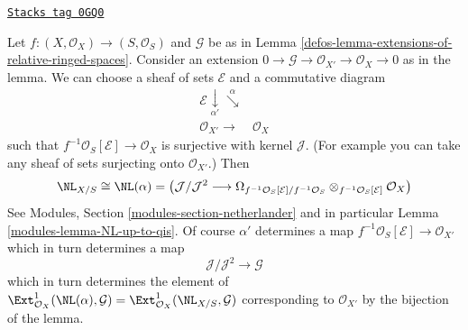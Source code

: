 \begin{remark}
\label{defos-remark-extensions-of-relative-ringed-spaces}
\href{https://stacks.math.columbia.edu/tag/0GQ0}{\texttt{Stacks tag 0GQ0}}

Let $f : (X, \mathcal{O}_X) \to (S, \mathcal{O}_S)$ and $\mathcal{G}$
be as in Lemma \ref{defos-lemma-extensions-of-relative-ringed-spaces}.
Consider an extension
$0 \to \mathcal{G} \to \mathcal{O}_{X'} \to \mathcal{O}_X \to 0$
as in the lemma. We can choose a sheaf of sets $\mathcal{E}$
and a commutative diagram
$$
\begin{array}{cc}\mathcal{E} \underset{\alpha'}{\downarrow}\overset{\alpha}{\searrow} &  \\ \mathcal{O}_{X'} \longrightarrow & \mathcal{O}_X\end{array}
$$
such that $f^{-1}\mathcal{O}_S[\mathcal{E}] \to \mathcal{O}_X$
is surjective with kernel $\mathcal{J}$.
(For example you can take any sheaf of sets surjecting
onto $\mathcal{O}_{X'}$.) Then
$$
\NL_{X/S} \cong \NL(\alpha) =
\left(
\mathcal{J}/\mathcal{J}^2
\longrightarrow
\Omega_{f^{-1}\mathcal{O}_S[\mathcal{E}]/f^{-1}\mathcal{O}_S}
\otimes_{f^{-1}\mathcal{O}_S[\mathcal{E}]} \mathcal{O}_X\right)
$$
See Modules, Section \ref{modules-section-netherlander} and in particular
Lemma \ref{modules-lemma-NL-up-to-qis}. Of course $\alpha'$ determines a map
$f^{-1}\mathcal{O}_S[\mathcal{E}] \to \mathcal{O}_{X'}$
which in turn determines a map
$$
\mathcal{J}/\mathcal{J}^2 \longrightarrow \mathcal{G}
$$
which in turn determines the element of
$\Ext^1_{\mathcal{O}_X}(\NL(\alpha), \mathcal{G}) =
\Ext^1_{\mathcal{O}_X}(\NL_{X/S}, \mathcal{G})$
corresponding to $\mathcal{O}_{X'}$ by the bijection of the lemma.
\end{remark}

